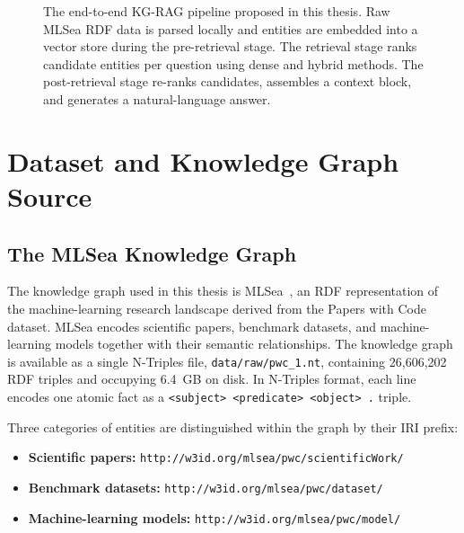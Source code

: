 \begin{figure}[htbp]
  \centering
  \caption{The end-to-end KG-RAG pipeline proposed in this thesis. Raw
    MLSea RDF data is parsed locally and entities are embedded into a
    vector store during the pre-retrieval stage. The retrieval stage ranks
    candidate entities per question using dense and hybrid methods. The
    post-retrieval stage re-ranks candidates, assembles a context block,
    and generates a natural-language answer.}
  \label{fig:pipeline_overview}
\end{figure}

\section{Dataset and Knowledge Graph Source}
\label{sec:dataset}

\subsection{The MLSea Knowledge Graph}
\label{subsec:mlsea}

The knowledge graph used in this thesis is MLSea~, an
RDF representation of the machine-learning research landscape derived from the
Papers with Code~ dataset.
MLSea encodes scientific papers, benchmark datasets, and machine-learning models
together with their semantic relationships.
The knowledge graph is available as a single N-Triples file,
\texttt{data/raw/pwc\_1.nt}, containing 26{,}606{,}202 RDF triples and
occupying 6.4~GB on disk.
In N-Triples format, each line encodes one atomic fact as a
\texttt{<subject> <predicate> <object> .} triple.

Three categories of entities are distinguished within the graph by their
IRI prefix:
\begin{itemize}
  \item \textbf{Scientific papers:} \texttt{http://w3id.org/mlsea/pwc/scientificWork/}
  \item \textbf{Benchmark datasets:} \texttt{http://w3id.org/mlsea/pwc/dataset/}
  \item \textbf{Machine-learning models:} \texttt{http://w3id.org/mlsea/pwc/model/}
\end{itemize}

